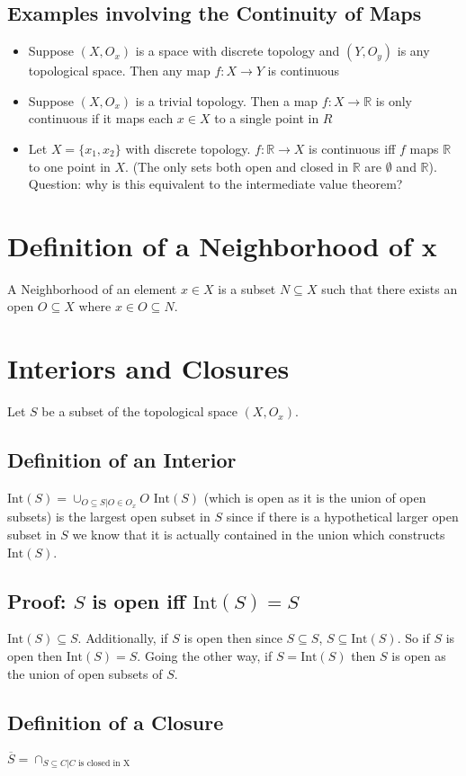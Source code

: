 \documentclass{homework}
\newcommand{\inte}{\text{Int}}
\newcommand{\clos}[1]{\overline{#1}}
\begin{document}
\subsection{Examples involving the Continuity of Maps}
\begin{itemize}
\item{Suppose $(X,O_x)$ is a space with discrete topology and $(Y,O_y)$ is any topological space. Then any map $f: X \rightarrow Y$ is continuous}
\item{Suppose $(X,O_x)$ is a trivial topology. Then a map $f: X \rightarrow \mathbb{R}$ is only continuous if it maps each $x \in X$ to a single point in $R$}
\item{Let $X = \{x_1,x_2\}$ with discrete topology. $f: \mathbb{R} \rightarrow X$ is continuous iff $f$ maps $\mathbb{R}$ to one point in $X$. (The only sets both open and closed in $\mathbb{R}$ are $\emptyset$ and $\mathbb{R}$). Question: why is this equivalent to the intermediate value theorem?}
\end{itemize}

\section{Definition of a Neighborhood of x}
A Neighborhood of an element $x \in X$ is a subset $N \subseteq X$ such that there exists an open $O \subseteq X$ where $x \in O \subseteq N$. 

\section{Interiors and Closures}
Let $S$ be a subset of the topological space $(X,O_x)$. 
\subsection{Definition of an Interior}
$\inte(S) = \cup_{O \subseteq S | O \in O_x}O$
$\inte(S)$ (which is open as it is the union of open subsets) is the largest open subset in $S$ since if there is a hypothetical larger open subset in $S$ we know that it is actually contained in the union which constructs $\inte(S)$.

\subsection{Proof: $S$ is open iff $\inte(S) = S$}
$\inte(S) \subseteq S$. Additionally, if $S$ is open then since $S \subseteq S$, $S  \subseteq \inte(S)$. So if $S$ is open then $\inte(S) =S$. Going the other way, if $S = \inte(S) $ then $S$ is open as the union of open subsets of $S$.

\subsection{Definition of a Closure}
$\clos{S} = \cap_{S \subseteq C | C \text{ is closed in X}}$
\end{document}
